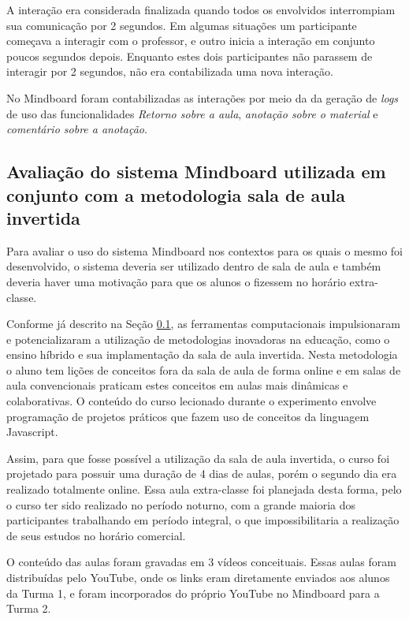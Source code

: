 A interação era considerada finalizada quando todos os envolvidos interrompiam sua comunicação por 2 segundos. Em algumas situações um participante começava a interagir com o professor, e outro inicia a interação em conjunto poucos segundos depois. Enquanto estes dois participantes não parassem de interagir por 2 segundos, não era contabilizada uma nova interação.

No Mindboard foram contabilizadas as interações por meio da da geração de \emph{logs} de uso das funcionalidades \emph{Retorno sobre a aula}, \emph{anotação sobre o material} e \emph{comentário sobre a anotação}.

\subsection{Avaliação do sistema Mindboard utilizada em conjunto com a metodologia sala de aula invertida}
\label{sec:flipped}

Para avaliar o uso do sistema Mindboard nos contextos para os quais o mesmo foi desenvolvido, o sistema deveria ser utilizado dentro de sala de aula e também deveria haver uma motivação para que os alunos o fizessem no horário extra-classe.

Conforme já descrito na Seção \ref{sec:flipped}, as ferramentas computacionais impulsionaram e potencializaram a utilização de metodologias inovadoras na educação, como o ensino híbrido e sua implamentação da sala de aula invertida. Nesta metodologia o aluno tem lições de conceitos fora da sala de aula de forma online e em salas de aula convencionais praticam estes conceitos em aulas mais dinâmicas e colaborativas. O conteúdo do curso lecionado durante o 
experimento envolve programação de projetos práticos que fazem uso de conceitos da linguagem Javascript.

Assim, para que fosse possível a utilização da sala de aula invertida, o curso foi projetado para possuir uma duração de 4 dias de aulas, porém o segundo dia era realizado totalmente online. Essa aula extra-classe foi planejada desta forma, pelo o curso ter sido realizado no período noturno, com a grande maioria dos participantes trabalhando em período integral, o que impossibilitaria a realização de seus estudos no horário comercial.

O conteúdo das aulas foram gravadas em 3 vídeos conceituais. Essas aulas foram distribuídas pelo YouTube, onde os links eram diretamente enviados aos alunos da Turma 1, e foram incorporados do próprio YouTube no Mindboard para a Turma 2.

